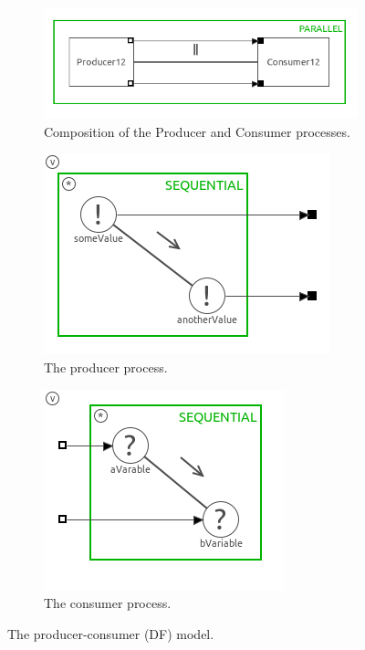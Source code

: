 \documentclass[a4paper,twoside,11pt]{article}
\begin{document}
\begin{figure}
 \centering
 \begin{subfigure}{\textwidth}
  \centering
  \includegraphics[scale=0.8]{./images/1_1-SystemDF_main.png}
  \caption{Composition of the Producer and Consumer processes.}
 \end{subfigure}
 \begin{subfigure}{0.5\textwidth}
  \centering
	\includegraphics[scale=0.8]{./images/1_1-SystemDF_prod.png}
	\caption{The producer process.}
 \end{subfigure}%
 \begin{subfigure}{0.5\textwidth}
  \centering
	\includegraphics[scale=0.8]{./images/1_1-SystemDF_cons.png}
	\caption{The consumer process.}
 \end{subfigure}
 \caption{The producer-consumer (DF) model.}
 \label{fig:SystemDF}
\end{figure}
\end{document}
